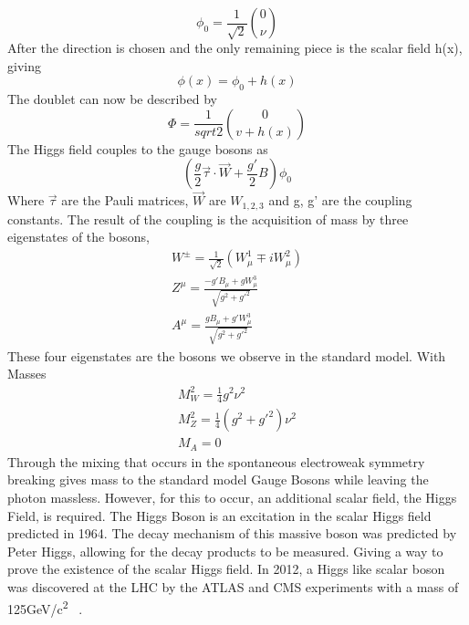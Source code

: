  
\begin{equation}
\phi_{0} = \frac{1}{\sqrt{2}} \binom{0}{\nu}
\end{equation}
After the direction is chosen and the only remaining piece is the scalar field h(x), giving 
\begin{equation}
\phi(x) = \phi_{0} + h(x)
\end{equation}
The doublet can now be described by 
\begin{equation}
\Phi = \frac{1}{sqrt{2}} \binom{0}{v+h(x)}
\end{equation}
The Higgs field couples to the gauge bosons as 
\begin{equation}
(\frac{g}{2}\overrightarrow{\tau}\cdot \overrightarrow{W} + \frac{g'}{2}B)\phi_{0}
\end{equation}
Where ${\overrightarrow{\tau}}$ are the Pauli matrices, ${\overrightarrow{W}}$ are ${W_{1,2,3}}$ and g, g' are the coupling constants. The result of the coupling is the acquisition of mass by three eigenstates of the bosons, 
\begin{equation}
\begin{split}
W^{\pm} = \frac{1}{\sqrt{2}}(W^{1}_{\mu} \mp iW^{2}_{\mu})\\
Z^{\mu} = \frac{-g'B_{\mu} + gW^{3}_{\mu}}{\sqrt{g^{2} + g'^{2}}}\\
A^{\mu} = \frac{gB_{\mu} + g'W^{3}_{\mu}}{\sqrt{g^{2} + g'^{2}}}
\end{split}
\end{equation}
These four eigenstates are the bosons we observe in the standard model. With Masses
\begin{equation}
\begin{split}
M^{2}_{W} = \frac{1}{4}g^{2}\nu^{2} \\
M^{2}_{Z} = \frac{1}{4}(g^{2} + g'^{2})\nu^{2} \\
M_{A} = 0
\end{split}
\end{equation}
Through the mixing that occurs in the spontaneous electroweak symmetry breaking gives mass to the standard model Gauge Bosons while leaving the photon massless. However, for this to occur, an additional scalar field, the Higgs Field, is required.\linebreak
\indent The Higgs Boson is an excitation in the scalar Higgs field predicted in 1964. The decay mechanism of this massive boson was predicted by Peter Higgs, allowing for the decay products to be measured. Giving a way to prove the existence of the scalar Higgs field. In 2012, a Higgs like scalar boson was discovered at the LHC by the ATLAS and CMS experiments with a mass of 125GeV/c\textsuperscript{2} ~\cite{Aad:2012tfa}.

